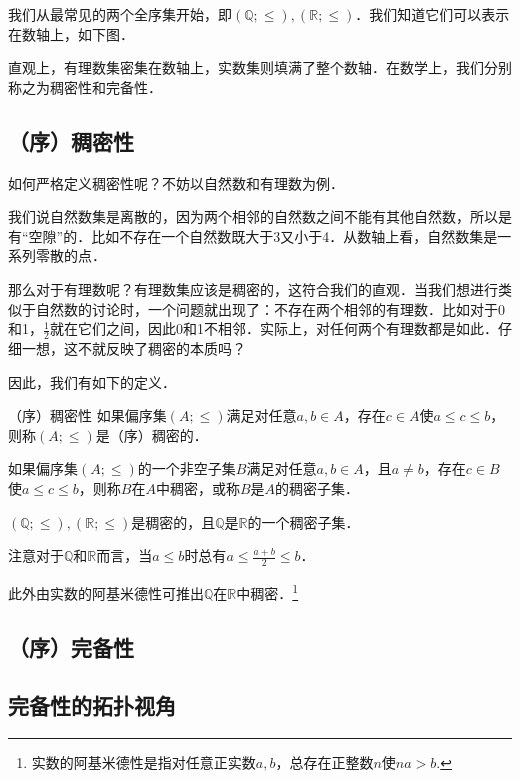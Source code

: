 
\begin{issues}
\issueDraft
\issueTODO
\end{issues}

我们从最常见的两个全序集开始，即$(\mathbb{Q};\leq),(\mathbb{R};\leq)$．我们知道它们可以表示在数轴上，如下图．


直观上，有理数集密集在数轴上，实数集则填满了整个数轴．在数学上，我们分别称之为稠密性和完备性．

\subsection{（序）稠密性}

如何严格定义稠密性呢？不妨以自然数和有理数为例．

我们说自然数集是离散的，因为两个相邻的自然数之间不能有其他自然数，所以是有“空隙”的．比如不存在一个自然数既大于3又小于4．从数轴上看，自然数集是一系列零散的点．

那么对于有理数呢？有理数集应该是稠密的，这符合我们的直观．当我们想进行类似于自然数的讨论时，一个问题就出现了：不存在两个相邻的有理数．比如对于0和1，$\frac{1}{2}$就在它们之间，因此0和1不相邻．实际上，对任何两个有理数都是如此．仔细一想，这不就反映了稠密的本质吗？

因此，我们有如下的定义．

\begin{definition}{（序）稠密性}
如果偏序集$(A;\leq)$满足对任意$a,b\in A$，存在$c\in A$使$a\leq c\leq b$，则称$(A;\leq)$是（序）稠密的．

如果偏序集$(A;\leq)$的一个非空子集$B$满足对任意$a,b\in A$，且$a\neq b$，存在$c\in B$使$a\leq c\leq b$，则称$B$在$A$中稠密，或称$B$是$A$的稠密子集．
\end{definition}

\begin{example}{}
$(\mathbb{Q};\leq),(\mathbb{R};\leq)$是稠密的，且$\mathbb{Q}$是$\mathbb{R}$的一个稠密子集．
\end{example}

注意对于$\mathbb{Q}$和$\mathbb{R}$而言，当$a\leq b$时总有$a\leq\frac{a+b}{2}\leq b$．

此外由实数的阿基米德性可推出$\mathbb{Q}$在$\mathbb{R}$中稠密．\footnote{实数的阿基米德性是指对任意正实数$a,b$，总存在正整数$n$使$na>b$.}

\subsection{（序）完备性}

\subsection{完备性的拓扑视角}

